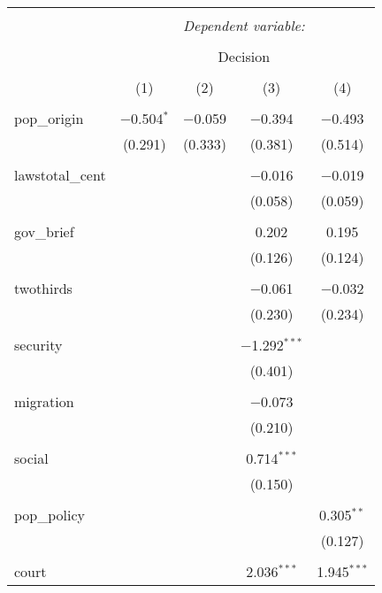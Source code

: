 
\begin{table}[!htbp] \centering 
  \caption{} 
  \label{} 
\begin{tabular}{@{\extracolsep{5pt}}lcccc} 
\\[-1.8ex]\hline 
\hline \\[-1.8ex] 
 & \multicolumn{4}{c}{\textit{Dependent variable:}} \\ 
\cline{2-5} 
\\[-1.8ex] & \multicolumn{4}{c}{Decision} \\ 
\\[-1.8ex] & (1) & (2) & (3) & (4)\\ 
\hline \\[-1.8ex] 
 pop\_origin & $-$0.504$^{*}$ & $-$0.059 & $-$0.394 & $-$0.493 \\ 
  & (0.291) & (0.333) & (0.381) & (0.514) \\ 
  & & & & \\ 
 lawstotal\_cent &  &  & $-$0.016 & $-$0.019 \\ 
  &  &  & (0.058) & (0.059) \\ 
  & & & & \\ 
 gov\_brief &  &  & 0.202 & 0.195 \\ 
  &  &  & (0.126) & (0.124) \\ 
  & & & & \\ 
 twothirds &  &  & $-$0.061 & $-$0.032 \\ 
  &  &  & (0.230) & (0.234) \\ 
  & & & & \\ 
 security &  &  & $-$1.292$^{***}$ &  \\ 
  &  &  & (0.401) &  \\ 
  & & & & \\ 
 migration &  &  & $-$0.073 &  \\ 
  &  &  & (0.210) &  \\ 
  & & & & \\ 
 social &  &  & 0.714$^{***}$ &  \\ 
  &  &  & (0.150) &  \\ 
  & & & & \\ 
 pop\_policy &  &  &  & 0.305$^{**}$ \\ 
  &  &  &  & (0.127) \\ 
  & & & & \\ 
 court &  &  & 2.036$^{***}$ & 1.945$^{***}$ \\ 

\end{tabular}
\end{table}
